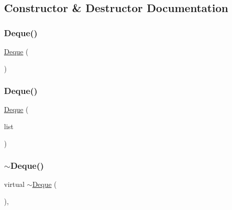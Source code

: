 \subsection{Constructor \& Destructor Documentation}
\mbox{\label{classDeque_a6514d251a0a76b440727037b2a205b3a}} 
\subsubsection{\texorpdfstring{Deque()}{Deque()}\hspace{0.1cm}{\footnotesize\ttfamily [1/2]}}
{\footnotesize\ttfamily \mbox{\hyperlink{classDeque}{Deque}} (\begin{DoxyParamCaption}{ }\end{DoxyParamCaption})\hspace{0.3cm}{\ttfamily [default]}}

\mbox{\label{classDeque_a68fd6ae6ef9283c882d90c6924e932cd}} 
\subsubsection{\texorpdfstring{Deque()}{Deque()}\hspace{0.1cm}{\footnotesize\ttfamily [2/2]}}
{\footnotesize\ttfamily \mbox{\hyperlink{classDeque}{Deque}} (\begin{DoxyParamCaption}\item[{std\+::initializer\+\_\+list$<$ Value\+Type $>$}]{list }\end{DoxyParamCaption})}

\mbox{\label{classDeque_a55937bfda443e26297e41cc1be5b93f0}} 
\subsubsection{\texorpdfstring{$\sim$\+Deque()}{~Deque()}}
{\footnotesize\ttfamily virtual $\sim$\mbox{\hyperlink{classDeque}{Deque}} (\begin{DoxyParamCaption}{ }\end{DoxyParamCaption})\hspace{0.3cm}{\ttfamily [virtual]}, {\ttfamily [default]}}



